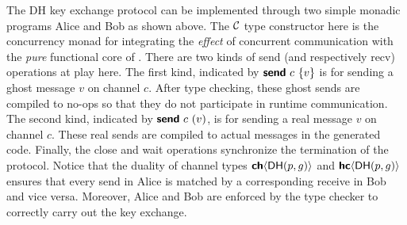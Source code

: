 The \textsf{DH} key exchange protocol can be implemented through two simple monadic
programs \textsf{Alice} and \textsf{Bob} as shown above. The $\mathcal{C}$ type constructor
here is the concurrency monad for integrating the \emph{effect} of concurrent
communication with the \emph{pure} functional core of \TLLC{}. There are two kinds of
\textsf{send} (and respectively \textsf{recv}) operations at play here.
The first kind, indicated by $\textbf{\textsf{send}}\ c\ \{v\}$ is for sending a ghost message
$v$ on channel $c$. After type checking, these ghost sends are compiled to no-ops
so that they do not participate in runtime communication. The second kind, indicated by
$\textbf{\textsf{send}}\ c\ (v)$, is for sending a real message $v$ on channel $c$. These
real sends are compiled to actual messages in the generated code. Finally, the
\textsf{close} and \textsf{wait} operations synchronize the termination of the protocol.
Notice that the duality of channel types ${\textbf{\textsf{ch}}\langle{\textsf{DH}(p,g)}\rangle}$ and ${\textbf{\textsf{hc}}\langle{\textsf{DH}(p,g)}\rangle}$
ensures that every send in \textsf{Alice} is matched by a corresponding receive in
\textsf{Bob} and vice versa. Moreover, \textsf{Alice} and \textsf{Bob} are enforced by the
type checker to correctly carry out the key exchange.

